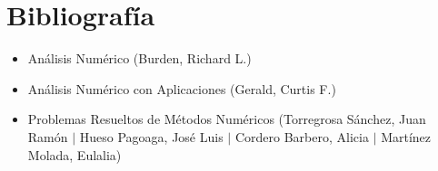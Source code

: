 \documentclass[a4paper]{article}
\begin{document}
\begin{itemize}
\begin{itemize}
\end{itemize}
\end{itemize}
\section{Bibliografía}
\begin{itemize}
    \item Análisis Numérico (Burden, Richard L.)
    \item Análisis Numérico con Aplicaciones (Gerald, Curtis F.)
    \item Problemas Resueltos de Métodos Numéricos (Torregrosa Sánchez, Juan Ramón $\vert$ Hueso Pagoaga, José Luis $\vert$ Cordero Barbero, Alicia $\vert$ Martínez Molada, Eulalia)
\end{itemize}
\end{document}
